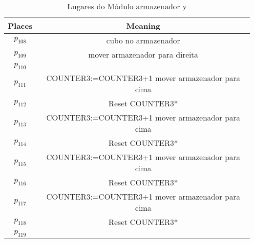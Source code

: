 \begin{table}[htbp]
\caption{Lugares do Módulo armazenador y}
\centering
\begin{tabular}{c|c}
Places & Meaning\\
\hline
\hyperlink{partialNet:p108}{\hypertarget{partialTable:p108}{$p_{108}$}} & cubo no armazenador\\
\hyperlink{partialNet:p109}{\hypertarget{partialTable:p109}{$p_{109}$}} & mover armazenador para direita\\
\hyperlink{partialNet:p110}{\hypertarget{partialTable:p110}{$p_{110}$}} & \\
\hyperlink{partialNet:p111}{\hypertarget{partialTable:p111}{$p_{111}$}} & COUNTER3:=COUNTER3+1 mover armazenador para cima\\
\hyperlink{partialNet:p112}{\hypertarget{partialTable:p112}{$p_{112}$}} & Reset COUNTER3*\\
\hyperlink{partialNet:p113}{\hypertarget{partialTable:p113}{$p_{113}$}} & COUNTER3:=COUNTER3+1 mover armazenador para cima\\
\hyperlink{partialNet:p114}{\hypertarget{partialTable:p114}{$p_{114}$}} & Reset COUNTER3*\\
\hyperlink{partialNet:p115}{\hypertarget{partialTable:p115}{$p_{115}$}} & COUNTER3:=COUNTER3+1 mover armazenador para cima\\
\hyperlink{partialNet:p116}{\hypertarget{partialTable:p116}{$p_{116}$}} & Reset COUNTER3*\\
\hyperlink{partialNet:p117}{\hypertarget{partialTable:p117}{$p_{117}$}} & COUNTER3:=COUNTER3+1 mover armazenador para cima\\
\hyperlink{partialNet:p118}{\hypertarget{partialTable:p118}{$p_{118}$}} & Reset COUNTER3*\\
\hyperlink{partialNet:p119}{\hypertarget{partialTable:p119}{$p_{119}$}} & \\
\end{tabular}
\end{table}

